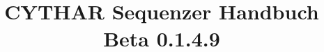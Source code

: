 \documentclass[10pt,final,a4paper]{report}
\author{}
\title{CYTHAR Sequenzer Handbuch\\ Beta 0.1.4.9}
\begin{document}
\sffamily %

\maketitle
\tableofcontents

%
%
%
\newcommand{
	\MyChapter}[2]{
		\chapter[#1]{#1}\label{chap:#2}}
\newcommand{
	\MyChapterSubTitle}[3]{
		\chapter[#1]{#1\newline\normalfont\small\textbf{{#2}}}
	\label{chap:#3}}
\newcommand{
	\MySection}[2]{\section[#1]{#1}\label{sec:#2}}
\newcommand{
	\MySectionSubTitle}[3]{
		\section[#1]{#1\newline\normalfont\small\textbf{{#2}}}
	\label{sec:#3}
}
\newcommand{
	\MySubSection}[2]{
		\subsection{#1}\label{sec:#2}}
\newcommand{
	\MySubSectionSubTitle}[3]{
		\subsection[#1]{#1\newline\normalfont\small\textbf{{#2}}}
	\label{sec:#3}}
\newcommand{
	\MySubSubSection}[2]{
		\subsubsection{#1}\label{sec:#2}}
\newcommand{
	\MySubSubSectionSubTitle}[3]{
		\subsubsection[#1]{#1\newline\normalfont\small\textbf{{#2}}}
	\label{sec:#3}}
\end{document}
